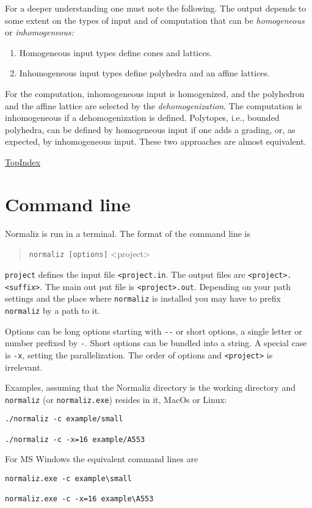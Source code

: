 \documentclass[12pt,a4paper]{scrartcl}
\theoremstyle{definition}
\def\SectStart#1{\section{#1}\label{#1}\def\SectHead{#1}}
\def\TopIndex{\bigskip\bigskip\par \hspace{120pt}\hyperref[Top]{\large Top}\hspace{120pt}\hyperref[Index]{\large Index}\newpage}
\begin{document}
For a deeper understanding one must note the following. The output depends to some extent on the types of input and of computation that can be \emph{homogeneous} or \emph{inhomogeneous:}
\begin{enumerate}
\item Homogeneous input types define cones and lattices.

\item Inhomogeneous input types define polyhedra and an affine lattices.
\end{enumerate}
For the computation, inhomogeneous input is homogenized, and the polyhedron and the affine lattice are selected by the \emph{dehomogenization}. The computation is inhomogeneous if a dehomogenization is defined. Polytopes, i.e., bounded polyhedra, can be defined by homogeneous input if one adds a grading, or, as expected, by inhomogeneous input. These two approaches are almost equivalent.

\TopIndex


\SectStart{Command line}

Normaliz is run in a terminal. The format of the command line is
\begin{quote}
	\verb|normaliz [options]| <project>
\end{quote}
\verb|project| defines the input file \verb|<project.in|. The output files are \verb|<project>.<suffix>|. The main out put file is \verb|<project>.out|. Depending on your path settings and the place where \verb|normaliz| is installed you may have to prefix \verb|normaliz| by a path to it.

Options can be long options starting with \verb|--| or short options, a single letter or number prefixed by \verb|-|. Short options can be bundled into a string. A special case is \verb|-x|, setting the parallelization. The order of options and \verb|<project>| is irrelevant. 

Examples, assuming that the Normaliz directory is the working directory and \verb|normaliz| (or \verb|normaliz.exe|) resides in it, MacOs or Linux:
\begin{Verbatim}
./normaliz -c example/small

./normaliz -c -x=16 example/A553
\end{Verbatim}
For MS Windows the equivalent command lines are
\begin{Verbatim}
normaliz.exe -c example\small

normaliz.exe -c -x=16 example\A553
\end{Verbatim}
\end{document}

